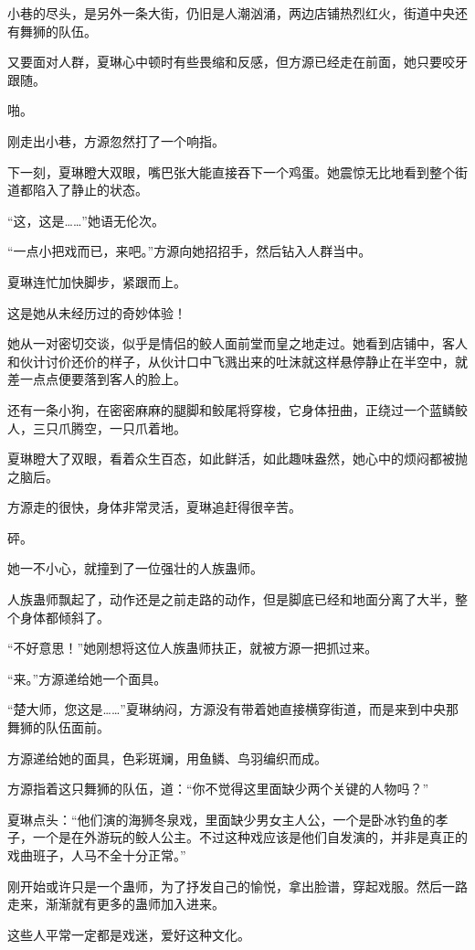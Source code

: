 \begin{this_body}
小巷的尽头，是另外一条大街，仍旧是人潮汹涌，两边店铺热烈红火，街道中央还有舞狮的队伍。

又要面对人群，夏琳心中顿时有些畏缩和反感，但方源已经走在前面，她只要咬牙跟随。

啪。

刚走出小巷，方源忽然打了一个响指。

下一刻，夏琳瞪大双眼，嘴巴张大能直接吞下一个鸡蛋。她震惊无比地看到整个街道都陷入了静止的状态。

“这，这是……”她语无伦次。

“一点小把戏而已，来吧。”方源向她招招手，然后钻入人群当中。

夏琳连忙加快脚步，紧跟而上。

这是她从未经历过的奇妙体验！

她从一对密切交谈，似乎是情侣的鲛人面前堂而皇之地走过。她看到店铺中，客人和伙计讨价还价的样子，从伙计口中飞溅出来的吐沫就这样悬停静止在半空中，就差一点点便要落到客人的脸上。

还有一条小狗，在密密麻麻的腿脚和鲛尾将穿梭，它身体扭曲，正绕过一个蓝鳞鲛人，三只爪腾空，一只爪着地。

夏琳瞪大了双眼，看着众生百态，如此鲜活，如此趣味盎然，她心中的烦闷都被抛之脑后。

方源走的很快，身体非常灵活，夏琳追赶得很辛苦。

砰。

她一不小心，就撞到了一位强壮的人族蛊师。

人族蛊师飘起了，动作还是之前走路的动作，但是脚底已经和地面分离了大半，整个身体都倾斜了。

“不好意思！”她刚想将这位人族蛊师扶正，就被方源一把抓过来。

“来。”方源递给她一个面具。

“楚大师，您这是……”夏琳纳闷，方源没有带着她直接横穿街道，而是来到中央那舞狮的队伍面前。

方源递给她的面具，色彩斑斓，用鱼鳞、鸟羽编织而成。

方源指着这只舞狮的队伍，道：“你不觉得这里面缺少两个关键的人物吗？”

夏琳点头：“他们演的海狮冬泉戏，里面缺少男女主人公，一个是卧冰钓鱼的孝子，一个是在外游玩的鲛人公主。不过这种戏应该是他们自发演的，并非是真正的戏曲班子，人马不全十分正常。”

刚开始或许只是一个蛊师，为了抒发自己的愉悦，拿出脸谱，穿起戏服。然后一路走来，渐渐就有更多的蛊师加入进来。

这些人平常一定都是戏迷，爱好这种文化。


\end{this_body}
